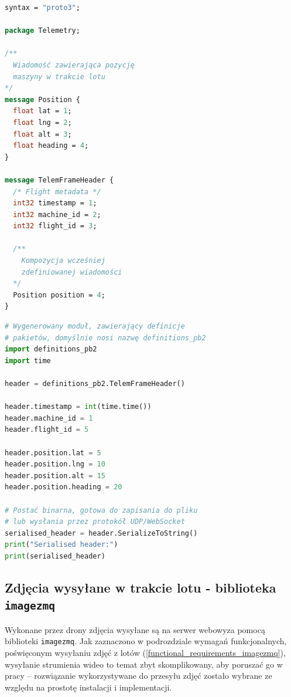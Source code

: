 \begin{lstlisting}[language=protobuf, label=list:protobuf,caption=Przykład definicji pakietu \texttt{protobuf}, basicstyle=\footnotesize\ttfamily]
syntax = "proto3";

package Telemetry;

/**
  Wiadomość zawierająca pozycję
  maszyny w trakcie lotu
*/
message Position {
  float lat = 1;
  float lng = 2;
  float alt = 3;
  float heading = 4;
}

message TelemFrameHeader {
  /* Flight metadata */
  int32 timestamp = 1;
  int32 machine_id = 2;
  int32 flight_id = 3;

  /**
	Kompozycja wcześniej
	zdefiniowanej wiadomości 
  */
  Position position = 4;
}
\end{lstlisting}

\begin{lstlisting}[language=Python, label=list:protobuf,caption=Przykład wykorzystania wygenerowanej implementacji pakietów w języku Python,basicstyle=\footnotesize\ttfamily]
# Wygenerowany moduł, zawierający definicje
# pakietów, domyślnie nosi nazwę definitions_pb2
import definitions_pb2
import time

header = definitions_pb2.TelemFrameHeader()

header.timestamp = int(time.time())
header.machine_id = 1
header.flight_id = 5

header.position.lat = 5
header.position.lng = 10
header.position.alt = 15
header.position.heading = 20

# Postać binarna, gotowa do zapisania do pliku
# lub wysłania przez protokół UDP/WebSocket
serialised_header = header.SerializeToString()
print("Serialised header:")
print(serialised_header) 
\end{lstlisting}

\subsection{Zdjęcia wysyłane w trakcie lotu - biblioteka \texttt{imagezmq}}

Wykonane przez drony zdjęcia wysyłane są na serwer webowyza pomocą biblioteki
\texttt{imagezmq}. Jak zaznaczono w podrozdziale wymagań funkcjonalnych, 
poświęconym wysyłaniu zdjęć z lotów (\ref{functional_requirements_imagezmq}),
wysyłanie strumienia wideo to temat zbyt skomplikowany, aby poruszać go w
pracy -- rozwiązanie wykorzystywane
do przesyłu zdjęć zostało wybrane ze względu na prostotę instalacji i implementacji.


